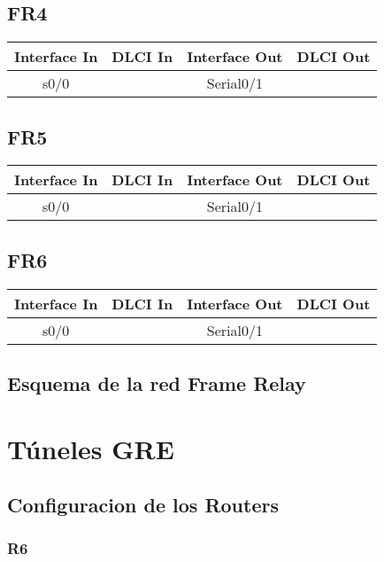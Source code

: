 \documentclass[12pt, a4paper, spanish]{article}
\begin{document}
\subsection{FR4}
\begin{tabular}{|c|c|c|c|}
\hline
Interface In & DLCI In & Interface Out & DLCI Out \\
\hline
\hline
 s0/0 &  & Serial0/1 &  \\
\hline
\end{tabular}

\subsection{FR5}
\begin{tabular}{|c|c|c|c|}
\hline
Interface In & DLCI In & Interface Out & DLCI Out \\
\hline
\hline
 s0/0 &  & Serial0/1 &  \\
\hline
\end{tabular}

\subsection{FR6}
\begin{tabular}{|c|c|c|c|}
\hline
Interface In & DLCI In & Interface Out & DLCI Out \\
\hline
\hline
 s0/0 &  & Serial0/1 &  \\
\hline
\end{tabular}

\newpage
\subsection{Esquema de la red Frame Relay}


\newpage
\section{Túneles GRE}
\subsection{Configuracion de los Routers}
\subsubsection{R6}
{\small
\begin{verbatim}

\end{verbatim}
}
\end{document}
